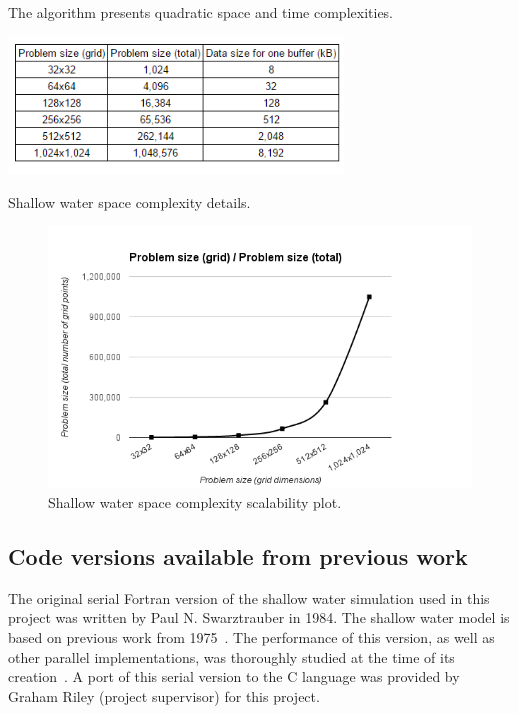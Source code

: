 The algorithm presents quadratic space and time complexities.

\begin{table}[!h]
\begin{center}
\centerline{\includegraphics[width=3.5in]{img/problemsizescaling}}
\caption{Shallow water space complexity details.}
\label{t:space}
\end{center}
\end{table}


\begin{figure}[!h]
\begin{center}
\centerline{\includegraphics[width=5.5in]{img/problemsizeplot}}
\caption{Shallow water space complexity scalability plot.}
\label{f:spaceplot}
\end{center}
\end{figure}


\subsection{Code versions available from previous work}

The original serial Fortran version of the shallow water simulation used in this project was written by Paul N. Swarztrauber in 1984. The shallow water model is based on previous work from 1975~\cite{sadourny1975dynamics}. The performance of this version, as well as other parallel implementations, was thoroughly studied at the time of its creation~\cite{mcbryan1988new}. A port of this serial version to the C language was provided by Graham Riley (project supervisor) for this project.

